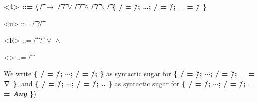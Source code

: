 \begin{grammar}
  \bfseries
  <t> ::= \c/ \| \t/ $\bm{\rightarrow}$ \t/
    \alt \t/ $\bm{\vee}$ \t/ \| \t/ $\bm{\wedge}$ \t/ \| \t/ $\bm{\backslash}$ \t/
    \alt [\meta{R}]
    \alt \{ \s/ = \u/; \ldots{}; \s/ = \u/; _ = \u/ \}

  <u> ::= \t/ \| ?\t/

  <R> ::= \t/ \|  \| ?
    \|  $\bm{\vee}$  \|  $\bm{\wedge}$ 

  <\τ> ::= \t/ %
\end{grammar}

We write \textbf{\{ \s/ = \u/; $\cdots{}$; \s/ = \u/; \}} as syntactic
sugar for \textbf{\{ \s/ = \u/; $\cdots{}$; \s/ = \u/; _ = $\nabla$ \}}, and
\textbf{\{ \s/ = \u/; $\cdots{}$; \s/ = \u/; .. \}} as syntactic sugar for
\textbf{\{ \s/ = \u/; $\cdots{}$; \s/ = \u/; _ = \textmd{\emph{Any}} \}})
